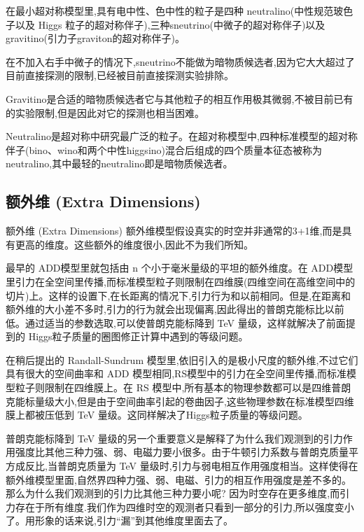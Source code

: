 \documentclass{beamer} %
\begin{document}
\begin{frame}
在最小超对称模型里,具有电中性、色中性的粒子是四种 neutralino(中性规范玻色子以及 Higgs 粒子的超对称伴子),三种sneutrino(中微子的超对称伴子)以及 gravitino(引力子graviton的超对称伴子)。

在不加入右手中微子的情况下,sneutrino不能做为暗物质候选者,因为它大大超过了目前直接探测的限制,已经被目前直接探测实验排除。

Gravitino是合适的暗物质候选者它与其他粒子的相互作用极其微弱,不被目前已有的实验限制,但是因此对它的探测也相当困难。

Neutralino是超对称中研究最广泛的粒子。在超对称模型中,四种标准模型的超对称伴子(bino、wino和两个中性higgsino)混合后组成的四个质量本征态被称为neutralino,其中最轻的neutralino即是暗物质候选者。
\end{frame}

\subsection{额外维 (Extra Dimensions) }

\begin{frame}{额外维 (Extra Dimensions)}
额外维模型假设真实的时空并非通常的3+1维,而是具有更高的维度。这些额外的维度很小,因此不为我们所知。

最早的 ADD模型里就包括由 n 个小于毫米量级的平坦的额外维度。在 ADD模型里引力在全空间里传播,而标准模型粒子则限制在四维膜(四维空间在高维空间中的切片)上。这样的设置下,在长距离的情况下,引力行为和以前相同。但是,在距离和额外维的大小差不多时,引力的行为就会出现偏离,因此得出的普朗克能标比以前低。通过适当的参数选取,可以使普朗克能标降到 TeV 量级，这样就解决了前面提到的 Higgs粒子质量的圈图修正计算中遇到的等级问题。
\end{frame}

\begin{frame}
在稍后提出的 Randall-Sundrum 模型里,依旧引入的是极小尺度的额外维,不过它们具有很大的空间曲率和 ADD 模型相同,RS模型中的引力在全空间里传播,而标准模型粒子则限制在四维膜上。在 RS 模型中,所有基本的物理参数都可以是四维普朗克能标量级大小,但是由于空间曲率引起的卷曲因子,这些物理参数在标准模型四维膜上都被压低到 TeV 量级。这同样解决了Higgs粒子质量的等级问题。

普朗克能标降到 TeV 量级的另一个重要意义是解释了为什么我们观测到的引力作用强度比其他三种力强、弱、电磁力要小很多。由于牛顿引力系数与普朗克质量平方成反比,当普朗克质量为 TeV 量级时,引力与弱电相互作用强度相当。这样使得在额外维模型里面,自然界四种力强、弱、电磁、引力的相互作用强度是差不多的。那么为什么我们观测到的引力比其他三种力要小呢? 因为时空存在更多维度,而引力存在于所有维度.我们作为四维时空的观测者只看到一部分的引力,所以强度变小了。用形象的话来说,引力“漏”到其他维度里面去了。
\end{frame}
\end{document}
